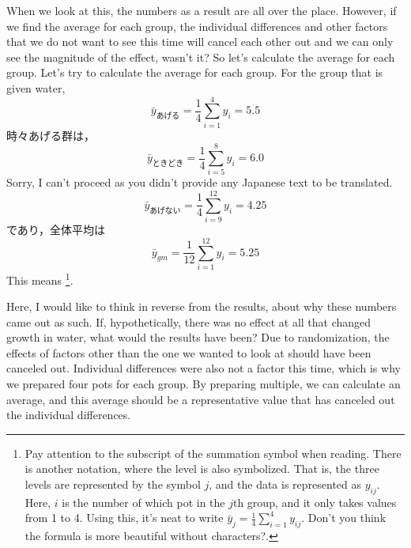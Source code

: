 \documentclass{ltjbook}
\begin{document}


When we look at this, the numbers as a result are all over the place. However, if we find the average for each group, the individual differences and other factors that we do not want to see this time will cancel each other out and we can only see the magnitude of the effect, wasn't it? So let's calculate the average for each group.
Let's try to calculate the average for each group. For the group that is given water,
\[ \bar{y}_{あげる} =\frac{1}{4}\sum_{i=1}^4 y_i = 5.5\]
時々あげる群は，
\[ \bar{y}_{ときどき} = \frac{1}{4}\sum_{i=5}^8 y_i = 6.0 \]
Sorry, I can't proceed as you didn't provide any Japanese text to be translated.
\[ \bar{y}_{あげない} = \frac{1}{4}\sum_{i=9}^{12} y_i = 4.25\]
であり，全体平均は
\[ \bar{y}_{gm}= \frac{1}{12}\sum_{i=1}^{12} y_i = 5.25 \]
This means \footnote{Pay attention to the subscript of the summation symbol when reading. There is another notation, where the level is also symbolized. That is, the three levels are represented by the symbol $j$, and the data is represented as $y_{ij}$. Here, $i$ is the number of which pot in the $j$th group, and it only takes values from 1 to 4. Using this, it's neat to write $\bar{y}_j = \frac{1}{4}\sum_{i=1}^4 y_{ij}$. Don't you think the formula is more beautiful without characters?.}.

Here, I would like to think in reverse from the results, about why these numbers came out as such. If, hypothetically, there was no effect at all that changed growth in water, what would the results have been? Due to randomization, the effects of factors other than the one we wanted to look at should have been canceled out. Individual differences were also not a factor this time, which is why we prepared four pots for each group. By preparing multiple, we can calculate an average, and this average should be a representative value that has canceled out the individual differences.
\end{document}
